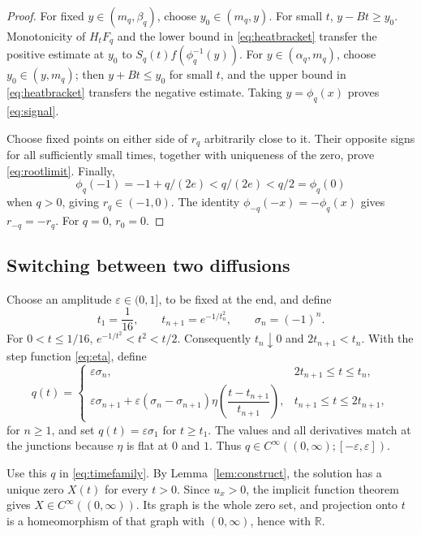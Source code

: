 \documentclass[11pt,reqno]{amsart}
\numberwithin{equation}{section}
\theoremstyle{definition}
\theoremstyle{remark}
\newcommand{\R}{\mathbb R}
\begin{document}
\begin{proof}
For fixed $y\in(m_q,\beta_q)$, choose $y_0\in(m_q,y)$. For small $t$, $y-Bt\geq y_0$. Monotonicity of $H_tF_q$ and the lower bound in \eqref{eq:heatbracket} transfer the positive estimate at $y_0$ to $S_q(t)f(\phi_q^{-1}(y))$. For $y\in(\alpha_q,m_q)$, choose $y_0\in(y,m_q)$; then $y+Bt\leq y_0$ for small $t$, and the upper bound in \eqref{eq:heatbracket} transfers the negative estimate. Taking $y=\phi_q(x)$ proves \eqref{eq:signal}.

Choose fixed points on either side of $r_q$ arbitrarily close to it. Their opposite signs for all sufficiently small times, together with uniqueness of the zero, prove \eqref{eq:rootlimit}. Finally,
\[
 \phi_q(-1)=-1+q/(2e)<q/(2e)<q/2=\phi_q(0)
\]
when $q>0$, giving $r_q\in(-1,0)$. The identity $\phi_{-q}(-x)=-\phi_q(x)$ gives $r_{-q}=-r_q$. For $q=0$, $r_0=0$.
\end{proof}

\subsection{Switching between two diffusions}
Choose an amplitude $\varepsilon\in(0,1]$, to be fixed at the end, and define
\begin{equation}\label{eq:times}
 t_1=\frac1{16},\qquad t_{n+1}=e^{-1/t_n^2},\qquad \sigma_n=(-1)^n.
\end{equation}
For $0<t\leq1/16$, $e^{-1/t^2}<t^2<t/2$. Consequently $t_n\downarrow0$ and $2t_{n+1}<t_n$. With the step function \eqref{eq:eta}, define
\begin{equation}\label{eq:switch}
 q(t)=
 \begin{cases}
 \varepsilon\sigma_n,&2t_{n+1}\leq t\leq t_n,\\[2pt]
 \varepsilon\sigma_{n+1}
 +\varepsilon(\sigma_n-\sigma_{n+1})
 \eta\!\left(\dfrac{t-t_{n+1}}{t_{n+1}}\right),
 &t_{n+1}\leq t\leq2t_{n+1},
 \end{cases}
\end{equation}
for $n\geq1$, and set $q(t)=\varepsilon\sigma_1$ for $t\geq t_1$. The values and all derivatives match at the junctions because $\eta$ is flat at $0$ and $1$. Thus $q\in C^\infty((0,\infty);[-\varepsilon,\varepsilon])$.

Use this $q$ in \eqref{eq:timefamily}. By Lemma~\ref{lem:construct}, the solution has a unique zero $X(t)$ for every $t>0$. Since $u_x>0$, the implicit function theorem gives $X\in C^\infty((0,\infty))$. Its graph is the whole zero set, and projection onto $t$ is a homeomorphism of that graph with $(0,\infty)$, hence with $\R$.
\end{document}

